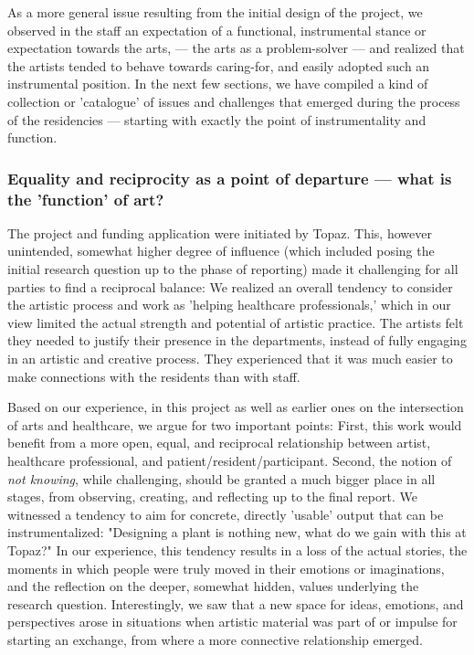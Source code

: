 \documentclass[authordate, empirical]{jote-new-article}
\begin{document}
	As a more general issue resulting from the initial design of the project, we observed in the staff an expectation of a functional, instrumental stance or expectation towards the arts, --- the arts as a problem-solver --- and realized that the artists tended to behave towards caring-for, and easily adopted such an instrumental position. In the next few sections, we have compiled a kind of collection or 'catalogue' of issues and challenges that emerged during the process of the residencies --- starting with exactly the point of instrumentality and function.







	\subsubsection{Equality and reciprocity as a point of departure --- what is the 'function' of art?}







	The project and funding application were initiated by Topaz. This, however unintended, somewhat higher degree of influence (which included posing the initial research question up to the phase of reporting) made it challenging for all parties to find a reciprocal balance: We realized an overall tendency to consider the artistic process and work as 'helping healthcare professionals,' which in our view limited the actual strength and potential of artistic practice. The artists felt they needed to justify their presence in the departments, instead of fully engaging in an artistic and creative process. They experienced that it was much easier to make connections with the residents than with staff.







	Based on our experience, in this project as well as earlier ones on the intersection of arts and healthcare, we argue for two important points: First, this work would benefit from a more open, equal, and reciprocal relationship between artist, healthcare professional, and patient/resident/participant. Second, the notion of \emph{not knowing}, while challenging, should be granted a much bigger place in all stages, from observing, creating, and reflecting up to the final report. We witnessed a tendency to aim for concrete, directly 'usable' output that can be instrumentalized: "Designing a plant is nothing new, what do we gain with this at Topaz?" In our experience, this tendency results in a loss of the actual stories, the moments in which people were truly moved in their emotions or imaginations, and the reflection on the deeper, somewhat hidden, values underlying the research question. Interestingly, we saw that a new space for ideas, emotions, and perspectives arose in situations when artistic material was part of or impulse for starting an exchange, from where a more connective relationship emerged.
\end{document}
